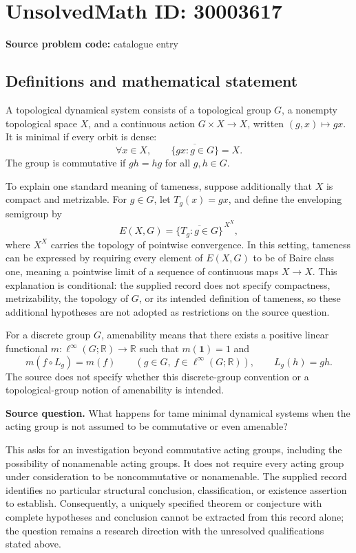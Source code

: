 \documentclass[11pt]{article}
\newcommand{\R}{\mathbb{R}}
\begin{document}
\section*{UnsolvedMath ID: 30003617}
\textbf{Source problem code:} catalogue entry
\subsection{Definitions and mathematical statement}
A topological dynamical system consists of a topological group \(G\), a nonempty topological space \(X\), and a continuous action \(G\times X\to X\), written \((g,x)\mapsto gx\). It is minimal if every orbit is dense:
\[
\forall x\in X,\qquad \overline{\{gx:g\in G\}}=X.
\]
The group is commutative if \(gh=hg\) for all \(g,h\in G\).

To explain one standard meaning of tameness, suppose additionally that \(X\) is compact and metrizable. For \(g\in G\), let \(T_g(x)=gx\), and define the enveloping semigroup by
\[
E(X,G)=\overline{\{T_g:g\in G\}}^{\,X^X},
\]
where \(X^X\) carries the topology of pointwise convergence. In this setting, tameness can be expressed by requiring every element of \(E(X,G)\) to be of Baire class one, meaning a pointwise limit of a sequence of continuous maps \(X\to X\). This explanation is conditional: the supplied record does not specify compactness, metrizability, the topology of \(G\), or its intended definition of tameness, so these additional hypotheses are not adopted as restrictions on the source question.

For a discrete group \(G\), amenability means that there exists a positive linear functional \(m:\ell^\infty(G;\R)\to\R\) such that \(m(\mathbf 1)=1\) and
\[
m(f\circ L_g)=m(f)\qquad(g\in G,\ f\in\ell^\infty(G;\R)),
\qquad L_g(h)=gh.
\]
The source does not specify whether this discrete-group convention or a topological-group notion of amenability is intended.

\textbf{Source question.} What happens for tame minimal dynamical systems when the acting group is not assumed to be commutative or even amenable?

This asks for an investigation beyond commutative acting groups, including the possibility of nonamenable acting groups. It does not require every acting group under consideration to be noncommutative or nonamenable. The supplied record identifies no particular structural conclusion, classification, or existence assertion to establish. Consequently, a uniquely specified theorem or conjecture with complete hypotheses and conclusion cannot be extracted from this record alone; the question remains a research direction with the unresolved qualifications stated above.
\end{document}
